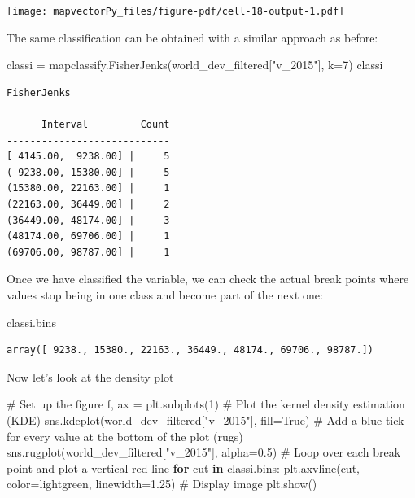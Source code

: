 \documentclass[
  letterpaper,
  DIV=11,
  numbers=noendperiod]{scrreprt}
\newenvironment{Shaded}{\begin{snugshade}}{\end{snugshade}}
\newcommand{\CommentTok}[1]{\textcolor[rgb]{0.37,0.37,0.37}{#1}}
\newcommand{\ControlFlowTok}[1]{\textcolor[rgb]{0.00,0.23,0.31}{\textbf{#1}}}
\newcommand{\DecValTok}[1]{\textcolor[rgb]{0.68,0.00,0.00}{#1}}
\newcommand{\FloatTok}[1]{\textcolor[rgb]{0.68,0.00,0.00}{#1}}
\newcommand{\KeywordTok}[1]{\textcolor[rgb]{0.00,0.23,0.31}{\textbf{#1}}}
\newcommand{\NormalTok}[1]{\textcolor[rgb]{0.00,0.23,0.31}{#1}}
\newcommand{\OperatorTok}[1]{\textcolor[rgb]{0.37,0.37,0.37}{#1}}
\newcommand{\StringTok}[1]{\textcolor[rgb]{0.13,0.47,0.30}{#1}}
\newcommand{\VariableTok}[1]{\textcolor[rgb]{0.07,0.07,0.07}{#1}}
\begin{document}
\texttt{[image: mapvectorPy\_files/figure-pdf/cell-18-output-1.pdf]}

The same classification can be obtained with a similar approach as
before:

\begin{Shaded}
\begin{Highlighting}[]
\NormalTok{classi }\OperatorTok{=}\NormalTok{ mapclassify.FisherJenks(world\_dev\_filtered[}\StringTok{"v\_2015"}\NormalTok{], k}\OperatorTok{=}\DecValTok{7}\NormalTok{)}
\NormalTok{classi}
\end{Highlighting}
\end{Shaded}

\begin{verbatim}
FisherJenks

      Interval         Count
----------------------------
[ 4145.00,  9238.00] |     5
( 9238.00, 15380.00] |     5
(15380.00, 22163.00] |     1
(22163.00, 36449.00] |     2
(36449.00, 48174.00] |     3
(48174.00, 69706.00] |     1
(69706.00, 98787.00] |     1
\end{verbatim}

Once we have classified the variable, we can check the actual break
points where values stop being in one class and become part of the next
one:

\begin{Shaded}
\begin{Highlighting}[]
\NormalTok{classi.bins}
\end{Highlighting}
\end{Shaded}

\begin{verbatim}
array([ 9238., 15380., 22163., 36449., 48174., 69706., 98787.])
\end{verbatim}

Now let's look at the density plot

\begin{Shaded}
\begin{Highlighting}[]
\CommentTok{\# Set up the figure}
\NormalTok{f, ax }\OperatorTok{=}\NormalTok{ plt.subplots(}\DecValTok{1}\NormalTok{)}
\CommentTok{\# Plot the kernel density estimation (KDE)}
\NormalTok{sns.kdeplot(world\_dev\_filtered[}\StringTok{"v\_2015"}\NormalTok{], fill}\OperatorTok{=}\VariableTok{True}\NormalTok{)}
\CommentTok{\# Add a blue tick for every value at the bottom of the plot (rugs)}
\NormalTok{sns.rugplot(world\_dev\_filtered[}\StringTok{"v\_2015"}\NormalTok{], alpha}\OperatorTok{=}\FloatTok{0.5}\NormalTok{)}
\CommentTok{\# Loop over each break point and plot a vertical red line}
\ControlFlowTok{for}\NormalTok{ cut }\KeywordTok{in}\NormalTok{ classi.bins:}
\NormalTok{    plt.axvline(cut, color}\OperatorTok{=}\StringTok{\textquotesingle{}lightgreen\textquotesingle{}}\NormalTok{, linewidth}\OperatorTok{=}\FloatTok{1.25}\NormalTok{)}
\CommentTok{\# Display image}
\NormalTok{plt.show()}
\end{Highlighting}
\end{Shaded}
\end{document}

